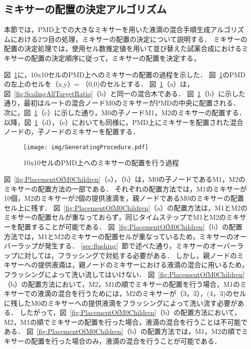\newpage

\subsection{ミキサーの配置の決定アルゴリズム}
本節では，PMD上での大きなミキサーを用いた液滴の混合手順生成アルゴリズムにおける2つ目の処理，ミキサーの配置の決定について説明する．
ミキサーの配置の決定処理では，使用セル数推定値を用いて並び替えた試薬合成におけるミキサーの配置の決定順序に従って，ミキサーの配置を決定する，

図~\ref{fig:GeneratingProcedure}に，10x10セルのPMD上へのミキサーの配置の過程を示した．
図~\ref{fig:GeneratingProcedure}のPMDの左上のセルを（x,y）= （0,0)のセルとする．
図~\ref{fig:GeneratingProcedure}（a）は，図~\ref{fig:ScalingAllTargetRatio}（b）と同一の混合木である．
図~\ref{fig:GeneratingProcedure}（b）に示した通り，最初はルートの混合ノードM0のミキサーがPMDの中央に配置される．
次に，図~\ref{fig:GeneratingProcedure}（c）に示した通り，M0の子ノードM1，M2のミキサーの配置する．
以降，図~\ref{fig:GeneratingProcedure}（d），（e）においても同様に，PMD上にミキサーを配置された混合ノードの，子ノードのミキサーを配置する．

\begin{figure}[tbp]
    \centering\texttt{[image: img/GeneratingProcedure.pdf]}
 \caption{10x10セルのPMD上へのミキサーの配置を行う過程}\label{fig:GeneratingProcedure}
\end{figure}

図~\ref{fig:PlacementOfM0Children}（a），（b）は，M0の子ノードであるM1，M2のミキサーの配置方法の一部である．
それぞれの配置方法では，M1のミキサーが10個，M2のミキサーが2個の提供液滴を，親ノードであるM0のミキサーの配置セル上に残す．
図~\ref{fig:PlacementOfM0Children}（a）の配置方法は，M1とM2のミキサーの配置セルが重なっておらず，同じタイムステップでM1とM2のミキサーを配置することが可能である．
図~\ref{fig:PlacementOfM0Children}（b）の配置方法では，M1とM2のミキサーの配置セルが重なっているため，ミキサーのオーバーラップが発生する．
\ref{sec:flushing}~節で述べた通り，ミキサーのオーバーラップに対しては，フラッシングで対処する必要がある．
しかし，親ノードのミキサーへの提供液滴は，親ノードのミキサーにおける液滴の混合に用いるため，フラッシングによって洗い流してはいけない．
図~\ref{fig:PlacementOfM0Children}（b）の配置方法において，M2，M1の順でミキサーの配置を行う場合，M1のミキサーでの液滴の混合を行うためには，M2のミキサーが（3，3），(4，3)のセルに残したM0のミキサーへの提供液滴をフラッシングによって洗い流す必要がある．
したがって，図~\ref{fig:PlacementOfM0Children}（b）の配置方法において，M2，M1の順でミキサーの配置を行った場合，液滴の混合を行うことは不可能である．
図~\ref{fig:PlacementOfM0Children}（b）の配置方法では，M1，M2の順でミキサーの配置を行った場合のみ，液滴の混合を行うことが可能である．

